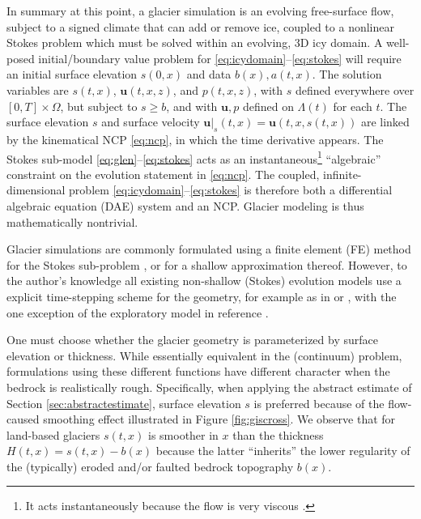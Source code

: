 \documentclass[hidelinks,onefignum,onetabnum,final]{siamart220329}  %
\newcommand{\bu}{\mathbf{u}}
\begin{document}
In summary at this point, a glacier simulation is an evolving free-surface flow, subject to a signed climate that can add or remove ice, coupled to a nonlinear Stokes problem which must be solved within an evolving, 3D icy domain.  A well-posed initial/boundary value problem for \eqref{eq:icydomain}--\eqref{eq:stokes} will require an initial surface elevation $s(0,x)$ and data $b(x),a(t,x)$.  The solution variables are $s(t,x)$, $\bu(t,x,z)$, and $p(t,x,z)$, with $s$ defined everywhere over $[0,T]\times \Omega$, but subject to $s \ge b$, and with $\bu,p$ defined on $\Lambda(t)$ for each $t$.  The surface elevation $s$ and surface velocity $\bu|_s(t,x)=\bu(t,x,s(t,x))$ are linked by the kinematical NCP \eqref{eq:ncp}, in which the time derivative appears.  The Stokes sub-model \eqref{eq:glen}--\eqref{eq:stokes} acts as an instantaneous\footnote{It acts instantaneously because the flow is very viscous \cite{Acheson1990}.} ``algebraic'' constraint on the evolution statement in \eqref{eq:ncp}.  The coupled, infinite-dimensional problem \eqref{eq:icydomain}--\eqref{eq:stokes} is therefore both a differential algebraic equation (DAE) system \cite{AscherPetzold1998} and an NCP.  Glacier modeling is thus mathematically nontrivial.

Glacier simulations are commonly formulated using a finite element (FE) method for the Stokes sub-problem \cite{IsaacStadlerGhattas2015,Jouvetetal2008,Pattynetal2008}, or for a shallow approximation thereof.  However, to the author's knowledge all existing non-shallow (Stokes) evolution models use a explicit time-stepping scheme for the geometry, for example as in \cite{Jouvetetal2008} or \cite{LofgrenAhlkronaHelanow2022}, with the one exception of the exploratory model in reference \cite{WirbelJarosch2020}.

One must choose whether the glacier geometry is parameterized by surface elevation or thickness.  While essentially equivalent in the (continuum) problem, formulations using these different functions have different character when the bedrock is realistically rough.  Specifically, when applying the abstract estimate of Section \ref{sec:abstractestimate}, surface elevation $s$ is preferred because of the flow-caused smoothing effect illustrated in Figure \ref{fig:giscross}.  We observe that for land-based glaciers $s(t,x)$ is smoother in $x$ than the thickness $H(t,x) = s(t,x)-b(x)$ because the latter ``inherits'' the lower regularity of the (typically) eroded and/or faulted bedrock topography $b(x)$.
\end{document}
